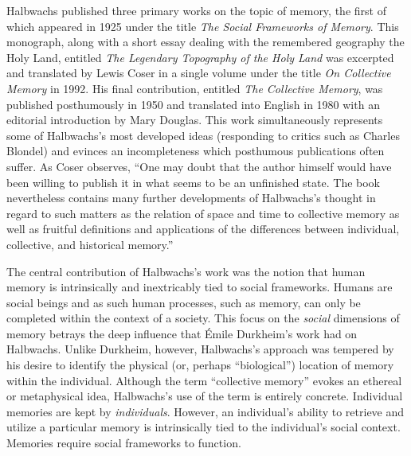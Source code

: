 Halbwachs published three primary works on the topic of memory, the
first of which appeared in 1925 under the title
\emph{The Social Frameworks of Memory}.\autocite{halbwachs1925} This
monograph, along with a short essay dealing with the remembered
geography the Holy Land, entitled
\emph{The Legendary Topography of the Holy Land}\autocite{halbwachs1941}
was excerpted and translated by Lewis Coser in a single volume under the
title \emph{On Collective Memory} in 1992.\autocite[Several of the most
important chapters of \emph{Social Frameworks} were included in full.
Likewise, the entirety of the conclusion of
\emph{Legendary Topography of the Holy Land} was
included][]{halbwachs1992} His final contribution, entitled
\emph{The Collective Memory}, was published posthumously in 1950 and
translated into English in 1980 with an editorial introduction by Mary
Douglas.\autocite{halbwachs1980} This work simultaneously represents
some of Halbwachs's most developed ideas (responding to critics such as
Charles Blondel) and evinces an incompleteness which posthumous
publications often suffer. As Coser observes, ``One may doubt that the
author himself would have been willing to publish it in what seems to be
an unfinished state. The book nevertheless contains many further
developments of Halbwachs's thought in regard to such matters as the
relation of space and time to collective memory as well as fruitful
definitions and applications of the differences between individual,
collective, and historical memory.''\autocite{coser_halbwachs1992}

The central contribution of Halbwachs's work was the notion that human
memory is intrinsically and inextricably tied to social frameworks.
Humans are social beings and as such human processes, such as memory,
can only be completed within the context of a society. This focus on the
\emph{social} dimensions of memory betrays the deep influence that Émile
Durkheim's work had on Halbwachs. Unlike Durkheim, however, Halbwachs's
approach was tempered by his desire to identify the physical (or,
perhaps ``biological'') location of memory within the individual.
Although the term ``collective memory'' evokes an ethereal or
metaphysical idea, Halbwachs's use of the term is entirely concrete.
Individual memories are kept by \emph{individuals}. However, an
individual's ability to retrieve and utilize a particular memory is
intrinsically tied to the individual's social context. Memories require
social frameworks to function.\autocite[38]{halbwachs1992}

